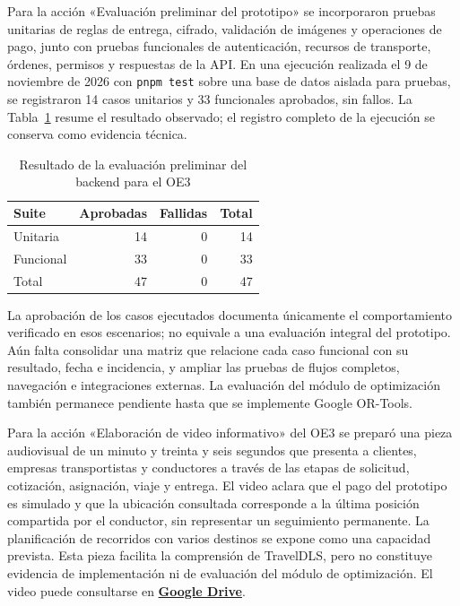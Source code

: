 Para la acción «Evaluación preliminar del prototipo» se incorporaron pruebas unitarias de reglas de entrega, cifrado, validación de imágenes y operaciones de pago, junto con pruebas funcionales de autenticación, recursos de transporte, órdenes, permisos y respuestas de la API. En una ejecución realizada el 9 de noviembre de 2026 con \texttt{pnpm test} sobre una base de datos aislada para pruebas, se registraron 14 casos unitarios y 33 funcionales aprobados, sin fallos. La Tabla~\ref{tab:pruebas-backend-oe3} resume el resultado observado; el registro completo de la ejecución se conserva como evidencia técnica.

\begin{table}[H]
\centering
\caption{Resultado de la evaluación preliminar del backend para el OE3}
\label{tab:pruebas-backend-oe3}
\begin{tabular}{@{}lrrr@{}}
\toprule
Suite & Aprobadas & Fallidas & Total \\
\midrule
Unitaria & 14 & 0 & 14 \\
Funcional & 33 & 0 & 33 \\
\midrule
Total & 47 & 0 & 47 \\
\bottomrule
\end{tabular}
\end{table}

La aprobación de los casos ejecutados documenta únicamente el comportamiento verificado en esos escenarios; no equivale a una evaluación integral del prototipo. Aún falta consolidar una matriz que relacione cada caso funcional con su resultado, fecha e incidencia, y ampliar las pruebas de flujos completos, navegación e integraciones externas. La evaluación del módulo de optimización también permanece pendiente hasta que se implemente Google OR-Tools.

\clearpage
\enlargethispage{\baselineskip}
Para la acción «Elaboración de video informativo» del OE3 se preparó una pieza audiovisual de un minuto y treinta y seis segundos que presenta a clientes, empresas transportistas y conductores a través de las etapas de solicitud, cotización, asignación, viaje y entrega. El video aclara que el pago del prototipo es simulado y que la ubicación consultada corresponde a la última posición compartida por el conductor, sin representar un seguimiento permanente. La planificación de recorridos con varios destinos se expone como una capacidad prevista. Esta pieza facilita la comprensión de TravelDLS, pero no constituye evidencia de implementación ni de evaluación del módulo de optimización. El video puede consultarse en \href{https://drive.google.com/file/d/1W6NnBVoQYwdqoSPIq6x3dcinMvR0S9kD/view?usp=drive_link}{\textbf{Google Drive}}.

